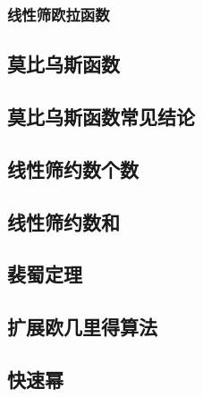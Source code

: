\documentclass[10pt,a4paper]{article}
\begin{document}
\subsubsection{线性筛欧拉函数}

\subsection{莫比乌斯函数}
\begin{spacing}{1.5}

\end{spacing}

\subsection{莫比乌斯函数常见结论}
\begin{spacing}{1.5}

\end{spacing}
\subsection{线性筛约数个数}
\begin{spacing}{1.5}

\end{spacing}

\subsection{线性筛约数和}
\begin{spacing}{1.5}

\end{spacing}

\subsection{裴蜀定理}
\begin{spacing}{1.5}

\end{spacing}
\subsection{扩展欧几里得算法}
\begin{spacing}{1.5}

\end{spacing}

\subsection{快速幂}

\end{document}
